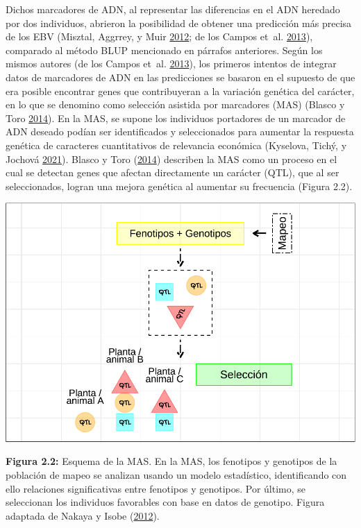 \documentclass[11pt,spanish,a4paper,oneside,]{book} %
\begin{document}
Dichos marcadores de ADN, al representar las diferencias en el ADN heredado por dos individuos, abrieron la posibilidad de obtener una predicción más precisa de los EBV (Misztal, Aggrrey, y Muir \protect\hyperlink{ref-cite:14}{2012}; de los Campos et~al. \protect\hyperlink{ref-cite:31}{2013}), comparado al método BLUP mencionado en párrafos anteriores. Según los mismos autores (de los Campos et~al. \protect\hyperlink{ref-cite:31}{2013}), los primeros intentos de integrar datos de marcadores de ADN en las predicciones se basaron en el supuesto de que era posible encontrar genes que contribuyeran a la variación genética del carácter, en lo que se denomino como selección asistida por marcadores (MAS) (Blasco y Toro \protect\hyperlink{ref-cite:3}{2014}). En la MAS, se supone los individuos portadores de un marcador de ADN deseado podían ser identificados y seleccionados para aumentar la respuesta genética de caracteres cuantitativos de relevancia económica (Kyselova, Tichý, y Jochová \protect\hyperlink{ref-cite:32}{2021}). Blasco y Toro (\protect\hyperlink{ref-cite:3}{2014}) describen la MAS como un proceso en el cual se detectan genes que afectan directamente un carácter (QTL), que al ser seleccionados, logran una mejora genética al aumentar su frecuencia (Figura 2.2).

\begin{center}\includegraphics[width=1\linewidth]{figures/MAS} \end{center}

\textbf{Figura 2.2:} Esquema de la MAS. En la MAS, los fenotipos y genotipos de la población de mapeo se analizan usando un modelo estadístico, identificando con ello relaciones significativas entre fenotipos y genotipos. Por último, se seleccionan los individuos favorables con base en datos de genotipo. Figura adaptada de Nakaya y Isobe (\protect\hyperlink{ref-cite:6}{2012}).
\end{document}
